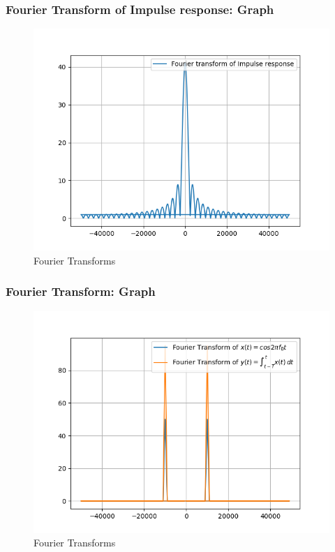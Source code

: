 \documentclass{beamer}
\begin{document}
\begin{frame}
    \frametitle {Fourier Transform of Impulse response: Graph}
    \begin{flushleft}
    \begin{figure}[!ht]
\centering
 \includegraphics[width=\columnwidth]{graphs/fourier_impulse_response.png}
 \caption{Fourier Transforms}
 \end{figure}
    \end{flushleft}
\end{frame}
\begin{frame}
    \frametitle {Fourier Transform: Graph}
    \begin{flushleft}
    \begin{figure}[!ht]
\centering
 \includegraphics[width=\columnwidth]{graphs/fourier.png}
 \caption{Fourier Transforms}
 \end{figure}
    \end{flushleft}
\end{frame}
\end{document}
